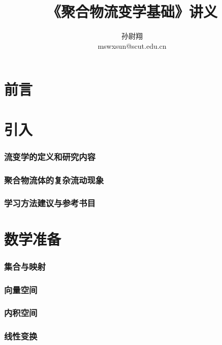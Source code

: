 \documentclass[zihao=-4,linespread=1.5,heading=true,a4paper,twoside]{ctexart}
\title{《聚合物流变学基础》讲义}
\author{孙尉翔\\mswxsun@scut.edu.cn}
\begin{document}
\begin{titlepage}
\maketitle
\end{titlepage}

\part*{前言}\label{sec:preface}


\newpage\tableofcontents

\newpage\part{引入}
\section{流变学的定义和研究内容}\label{sec:I.1}

\section{聚合物流体的复杂流动现象}\label{sec:I.2}

\section{学习方法建议与参考书目}\label{sec:I.3}


\newpage\part{数学准备}
\section{集合与映射}\label{sec:II.1}


\section{向量空间}\label{sec:II.2}


\section{内积空间}\label{sec:II.3}


\section{线性变换}\label{sec:II.4}

\end{document}
